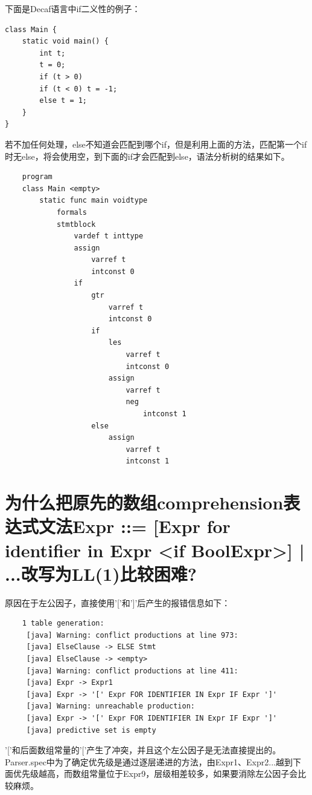 \documentclass{article}
\begin{document}
下面是Decaf语言中if二义性的例子：
\begin{lstlisting}
class Main {
    static void main() {
        int t;
        t = 0;
        if (t > 0) 
        if (t < 0) t = -1;
        else t = 1;
    }
}
\end{lstlisting}
若不加任何处理，else不知道会匹配到哪个if，但是利用上面的方法，匹配第一个if时无else，将会使用空，到下面的if才会匹配到else，语法分析树的结果如下。

\begin{lstlisting}
    program
    class Main <empty>
        static func main voidtype
            formals
            stmtblock
                vardef t inttype
                assign
                    varref t
                    intconst 0
                if
                    gtr
                        varref t
                        intconst 0
                    if
                        les
                            varref t
                            intconst 0
                        assign
                            varref t
                            neg
                                intconst 1
                    else
                        assign
                            varref t
                            intconst 1
\end{lstlisting}

\section{为什么把原先的数组comprehension表达式文法Expr ::= [Expr for identifier in Expr <if BoolExpr>] | ...改写为LL(1)比较困难?􏰀}
原因在于左公因子，直接使用'['和']'后产生的报错信息如下：
\begin{lstlisting}
    1 table generation:
     [java] Warning: conflict productions at line 973:
     [java] ElseClause -> ELSE Stmt
     [java] ElseClause -> <empty>
     [java] Warning: conflict productions at line 411:
     [java] Expr -> Expr1
     [java] Expr -> '[' Expr FOR IDENTIFIER IN Expr IF Expr ']'
     [java] Warning: unreachable production:
     [java] Expr -> '[' Expr FOR IDENTIFIER IN Expr IF Expr ']'
     [java] predictive set is empty
\end{lstlisting}
'['和后面数组常量的'['产生了冲突，并且这个左公因子是无法直接提出的。Parser.spec中为了确定优先级是通过逐层递进的方法，由Expr1、Expr2...越到下面优先级越高，而数组常量位于Expr9，层级相差较多，如果要消除左公因子会比较麻烦。
\end{document}
